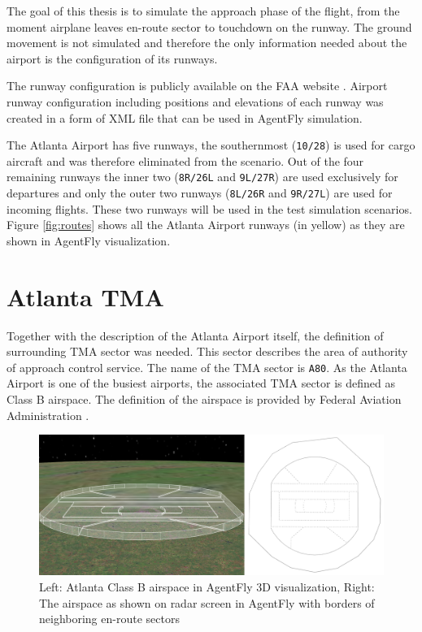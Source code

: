 The goal of this thesis is to simulate the approach phase of the flight, from the moment airplane leaves en-route sector to touchdown on the runway. The ground movement is not simulated and therefore the only information needed about the airport is the configuration of its runways.

The runway configuration is publicly available on the FAA website \cite{atlanta-diagram}. Airport runway configuration including positions and elevations of each runway was created in a form of XML file that can be used in AgentFly simulation.

The Atlanta Airport has five runways, the southernmost (\texttt{10/28}) is used for cargo aircraft and was therefore eliminated from the scenario. Out of the four remaining runways the inner two (\texttt{8R/26L} and \texttt{9L/27R}) are used exclusively for departures and only the outer two runways (\texttt{8L/26R} and \texttt{9R/27L}) are used for incoming flights. These two runways will be used in the test simulation scenarios. Figure \ref{fig:routes} shows all the Atlanta Airport runways (in yellow) as they are shown in AgentFly visualization.

\section{Atlanta TMA}

Together with the description of the Atlanta Airport itself, the definition of surrounding TMA sector was needed. This sector describes the area of authority of approach control service. The name of the TMA sector is \texttt{A80}. As the Atlanta Airport is one of the busiest airports, the associated TMA sector is defined as Class B airspace. The definition of the airspace is provided by Federal Aviation Administration \cite{atlanta-tma}.

\begin{figure}[H]
    \centering
    \includegraphics[width=\textwidth]{figures/tracon.png}
    \caption{Left: Atlanta Class B airspace in AgentFly 3D visualization, Right: The airspace as shown on radar screen in AgentFly with borders of neighboring en-route sectors}
    \label{fig:tracon}
\end{figure}

